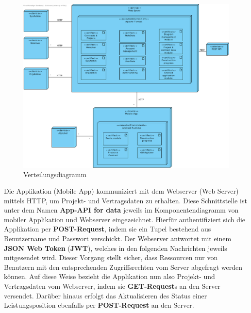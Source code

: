 \begin{figure}[h]
\centering
\includegraphics[width=\linewidth]{img/diagrams/Deployment-Diagram.pdf}
\caption{Verteilungsdiagramm}
\end{figure}

\clearpage

\noindent
Die Applikation (Mobile App) kommuniziert mit dem Webserver (Web Server) mittels HTTP,  um Projekt- und Vertragsdaten zu erhalten.  
Diese Schnittstelle ist unter dem Namen \textbf{App-API for data} jeweils im Komponentendiagramm von mobiler Applikation und Webserver eingezeichnet.
Hierf\"ur authentifiziert sich die Applikation per \textbf{POST-Request},  indem sie ein Tupel bestehend aus Benutzername und Passwort verschickt.  
Der Webserver antwortet mit einem \textbf{JSON Web Token} (\textbf{JWT}),  welches in den folgenden Nachrichten jeweils mitgesendet wird. 
Dieser Vorgang stellt sicher, dass Ressourcen nur von Benutzern mit den entsprechenden Zugriffsrechten vom Server abgefragt werden k\"onnen.
Auf diese Weise bezieht die Applikation nun also Projekt- und Vertragsdaten  vom Webserver,  indem sie \textbf{GET-Request}s an den Server versendet.  
Dar\"uber hinaus erfolgt das Aktualisieren des Status einer Leistungsposition ebenfalls per \textbf{POST-Request} an den Server.
